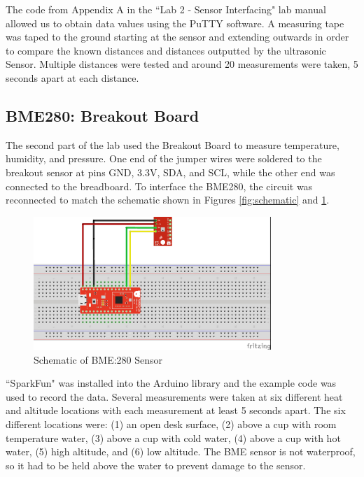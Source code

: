 \documentclass[11pt]{article}
\begin{document}
The code from Appendix A in the ``Lab 2 - Sensor Interfacing" lab manual allowed us to obtain data values using the PuTTY software. A measuring tape was taped to the ground starting at the sensor and extending outwards in order to compare the known distances and distances outputted by the ultrasonic Sensor. Multiple distances were tested and around 20 measurements were taken, 5 seconds apart at each distance.\\

\subsection{BME280: Breakout Board}

The second part of the lab used the Breakout Board to measure temperature, humidity, and pressure. One end of the jumper wires were soldered to the breakout sensor at pins {\selectfont GND, 3.3V, SDA,} and {\selectfont SCL}, while the other end was connected to the breadboard. To interface the BME280, the circuit was reconnected to match the schematic shown in Figures \ref{fig:schematic} and \ref{fig:sch_temp}.\\ 

\begin{figure}[ht]
    \centering
    \includegraphics[width=0.8\textwidth]{pics/BME280Sensor.jpg}
    \caption{Schematic of BME:280 Sensor}
    \label{fig:sch_temp}
\end{figure}

``SparkFun" was installed into the Arduino library and the example code was used to record the data. Several measurements were taken at six different heat and altitude locations with each measurement at least 5 seconds apart. The six different locations were: (1) an open desk surface, (2) above a cup with room temperature water, (3) above a cup with cold water, (4) above a cup with hot water, (5) high altitude, and (6) low altitude. The BME sensor is not waterproof, so it had to be held above the water to prevent damage to the sensor.  
\end{document}

